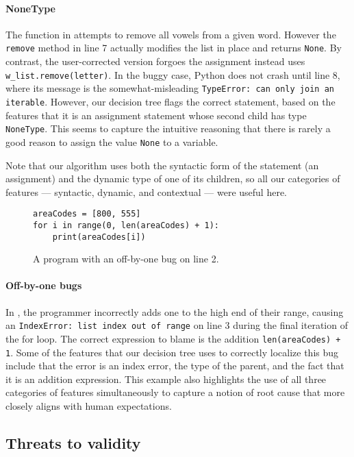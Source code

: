 \documentclass[conference]{IEEEtran}
\newcommand\lt[1]{{\lstinline|#1|}}
\begin{document}
\paragraph{NoneType}
The function in  attempts to remove all vowels from
a given word. However the \lt{remove} method in line 7 actually modifies
the list in place and returns \lt{None}. By contrast, the user-corrected
version forgoes the assignment instead uses \lt{w_list.remove(letter)}. In
the buggy case, Python does not crash until line 8, where its message is
the somewhat-misleading \lt{TypeError: can only join an iterable}. However,
our decision tree flags the correct statement, based on the features 
that it is an assignment statement whose second child has type
\lt{NoneType}. This seems to capture the intuitive reasoning that there is
rarely a good reason to assign the value \lt{None} to a variable. 

Note that our algorithm uses both the syntactic form of the statement (an
assignment) and the dynamic type of one of its children, so all our
categories of features --- syntactic, dynamic, and contextual --- were
useful here.

\begin{figure}
\begin{lstlisting}
areaCodes = [800, 555]
for i in range(0, len(areaCodes) + 1):
    print(areaCodes[i])
\end{lstlisting}
\caption{A program with an off-by-one bug on line 2.}
\label{fig-win-example-two}
\end{figure}

\paragraph{Off-by-one bugs}
In , the programmer incorrectly adds one to the high
end of their range, causing an \lt{IndexError: list index out of range} on line
3 during the final iteration of the for loop. The correct expression to blame
is the addition \lt{len(areaCodes) + 1}. Some of the features that our
decision tree uses to correctly localize this bug include that the error is an
index error, the type of the parent, and the fact that it is an addition
expression. This example also highlights the use of all three categories of
features simultaneously to capture a notion of root cause that more closely
aligns with human expectations.

\subsection{Threats to validity}
\label{sec-threats}
\end{document}
